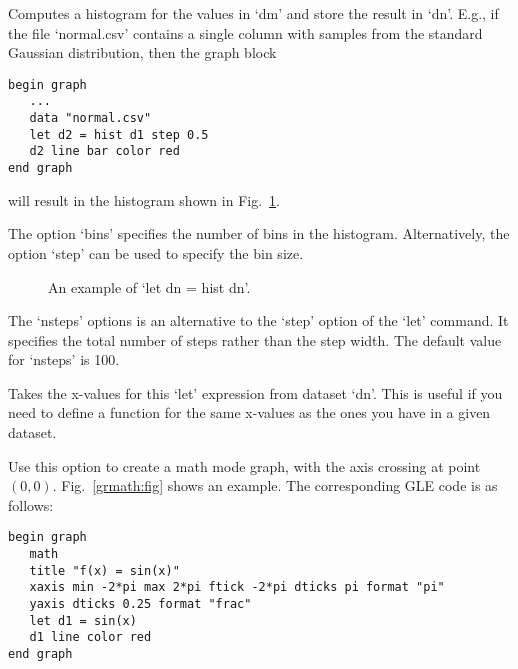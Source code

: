 \begin{commanddescription}
\item[{\sf let ds = hist dm [from {\it x1}] [to {\it x2}] [bins {\it n}] [step {\it n}]}]

Computes a histogram for the values in `dm' and store the result in `dn'. E.g., if the file `normal.csv' contains a single column with samples from the standard Gaussian distribution, then the graph block

\begin{Verbatim}
begin graph
   ...
   data "normal.csv"
   let d2 = hist d1 step 0.5
   d2 line bar color red 
end graph
\end{Verbatim}

\noindent{}will result in the histogram shown in Fig.~\ref{hist:fig}.

The option `{\sf bins}' specifies the number of bins in the histogram. Alternatively, the option `{\sf step}' can be used to specify the bin size.

\begin{figure}[tb]
\centering
\mbox{}
\caption{\label{hist:fig}An example of `let dn = hist dn'.}
\end{figure}

\item[{\sf let ds = \ldots [nsteps {\it n}]}]

The `nsteps' options is an alternative to the `step' option of the `let' command. It specifies the total number of steps rather than the step width. The default value for `nsteps' is 100.

\item[{\sf let ds = \ldots [range {\it dn}]}]

Takes the x-values for this `let' expression from dataset `dn'. This is useful if you need to define a function for the same x-values as the ones you have in a given dataset.

\item[{\sf math}]
Use this option to create a math mode graph, with the axis crossing at point $(0,0)$. Fig.~\ref{grmath:fig} shows an example. The corresponding GLE code is as follows:

\begin{Verbatim}
begin graph
   math
   title "f(x) = sin(x)"
   xaxis min -2*pi max 2*pi ftick -2*pi dticks pi format "pi"
   yaxis dticks 0.25 format "frac"
   let d1 = sin(x)
   d1 line color red
end graph
\end{Verbatim}


\end{commanddescription}
